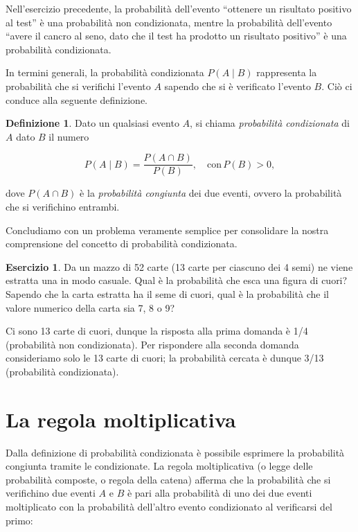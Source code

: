 \documentclass[
  11pt,
]{krantz}
\theoremstyle{definition}
\newtheorem{definition}{Definizione}[chapter]
\theoremstyle{definition}
\theoremstyle{definition}
\newtheorem{exercise}{Esercizio}[chapter]
\theoremstyle{definition}
\theoremstyle{remark}
\begin{document}
Nell'esercizio precedente, la probabilità dell'evento ``ottenere un risultato positivo al test'' è una probabilità non condizionata, mentre la probabilità dell'evento ``avere il cancro al seno, dato che il test ha prodotto un risultato positivo'' è una probabilità condizionata.

In termini generali, la probabilità condizionata \(P(A \mid B)\) rappresenta la probabilità che si verifichi l'evento \(A\) sapendo che si è verificato l'evento \(B\). Ciò ci conduce alla seguente definizione.

\begin{definition}
Dato un qualsiasi evento \(A\), si chiama \emph{probabilità condizionata} di \(A\) dato \(B\) il numero

\begin{equation}
P(A \mid B) = \frac{P(A \cap B)}{P(B)}, \quad \text{con}\, P(B) > 0,
\label{eq:probcond}
\end{equation}

dove \(P(A\cap B)\) è la \emph{probabilità congiunta} dei due eventi, ovvero la probabilità che si verifichino entrambi.
\end{definition}

Concludiamo con un problema veramente semplice per consolidare la nostra comprensione del concetto di probabilità condizionata.

\begin{exercise}
Da un mazzo di 52 carte (13 carte per ciascuno dei 4 semi) ne viene estratta una in modo casuale. Qual è la probabilità che esca una figura di cuori? Sapendo che la carta estratta ha il seme di cuori, qual è la probabilità che il valore numerico della carta sia 7, 8 o 9?

Ci sono 13 carte di cuori, dunque la risposta alla prima domanda è 1/4 (probabilità non condizionata). Per rispondere alla seconda domanda consideriamo solo le 13 carte di cuori; la probabilità cercata è dunque 3/13 (probabilità condizionata).
\end{exercise}

\hypertarget{la-regola-moltiplicativa}{%
\section{La regola moltiplicativa}\label{la-regola-moltiplicativa}}

Dalla definizione di probabilità condizionata è possibile esprimere la probabilità congiunta tramite le condizionate. La regola moltiplicativa (o legge delle probabilità composte, o regola della catena) afferma che la probabilità che si verifichino due eventi \(A\) e \(B\) è pari alla probabilità di uno dei due eventi moltiplicato con la probabilità dell'altro evento condizionato al verificarsi del primo:
\end{document}
